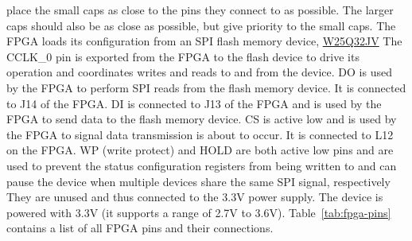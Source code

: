 place the small caps as close to the pins they connect to as possible. The larger caps should also
be as close as possible, but give priority to the small caps.  The FPGA loads its configuration from
an SPI flash memory device,
\href{http://www.winbond.com/resource-files/w25q32jv\%20revg\%2003272018\%20plus.pdf}{W25Q32JV} The
CCLK\_0 pin is exported from the FPGA to the flash device to drive its operation and coordinates
writes and reads to and from the device. DO is used by the FPGA to perform SPI reads from the flash
memory device. It is connected to J14 of the FPGA. DI is connected to J13 of the FPGA and is used by
the FPGA to send data to the flash memory device. CS is active low and is used by the FPGA to signal
data transmission is about to occur. It is connected to L12 on the FPGA. WP (write protect) and HOLD
are both active low pins and are used to prevent the status configuration registers from being
written to and can pause the device when multiple devices share the same SPI signal, respectively
They are unused and thus connected to the 3.3V power supply. The device is powered with 3.3V (it
supports a range of 2.7V to 3.6V). Table~\ref{tab:fpga-pins} contains a list of all FPGA pins and
their connections.

